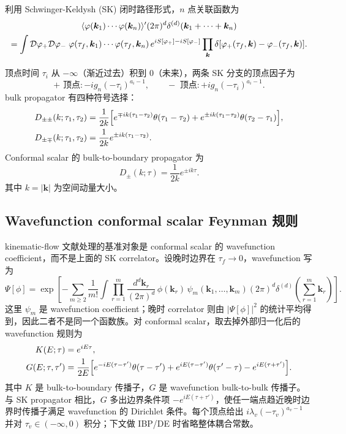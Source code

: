 ﻿\documentclass[a4paper,11pt]{article}
\begin{document}
利用 Schwinger-Keldysh (SK) 闭时路径形式，$n$ 点关联函数为
\begin{gather}
    \langle\varphi(\boldsymbol{k}_1)\cdots\varphi(\boldsymbol{k}_n)\rangle'(2\pi)^d\delta^{(d)}(\boldsymbol{k}_1+\cdots+\boldsymbol{k}_n)\notag\\
    =\int\mathcal{D}\varphi_+\mathcal{D}\varphi_-\;\varphi(\tau_f,\boldsymbol{k}_1)\cdots\varphi(\tau_f,\boldsymbol{k}_n)\,e^{iS[\varphi_+]-iS[\varphi_-]}\prod_{\boldsymbol{k}}\delta[\varphi_+(\tau_f,\boldsymbol{k})-\varphi_-(\tau_f,\boldsymbol{k})].
\end{gather}

顶点时间 $\tau_i$ 从 $-\infty$（渐近过去）积到 $0$（未来），两条 SK 分支的顶点因子为
\begin{equation}
    +\text{ 顶点}: -ig_n(-\tau_i)^{a_i-1},\qquad
    -\text{ 顶点}: +ig_n(-\tau_i)^{a_i-1}.
\end{equation}
bulk propagator 有四种符号选择：
\begin{align}
D_{\pm\pm}(k;\tau_1,\tau_2)
&=\frac{1}{2k}\Bigl[e^{\mp ik(\tau_1-\tau_2)}\theta(\tau_1-\tau_2)+e^{\pm ik(\tau_1-\tau_2)}\theta(\tau_2-\tau_1)\Bigr],\\
D_{\pm\mp}(k;\tau_1,\tau_2)
&=\frac{1}{2k}e^{\pm ik(\tau_1-\tau_2)}.
\end{align}
Conformal scalar 的 bulk-to-boundary propagator 为
\begin{equation}
    D_{\pm}(k;\tau)=\frac{1}{2k}e^{\pm ik\tau}.
\end{equation}
其中 $k=|\boldsymbol{k}|$ 为空间动量大小。

\subsection{Wavefunction conformal scalar Feynman 规则}

kinematic-flow 文献处理的基准对象是 conformal scalar 的 wavefunction coefficient，而不是上面的 SK correlator。设晚时边界在 $\tau_f\to0$，wavefunction 写为
\begin{equation}
    \Psi[\phi]=
    \exp\left[-\sum_{m\ge2}\frac{1}{m!}\int\prod_{r=1}^{m}\frac{d^d\boldsymbol{k}_r}{(2\pi)^d}\,
    \phi(\boldsymbol{k}_r)\,
    \psi_m(\boldsymbol{k}_1,\dots,\boldsymbol{k}_m)
    (2\pi)^d\delta^{(d)}\!\left(\sum_{r=1}^{m}\boldsymbol{k}_r\right)\right].
\end{equation}
这里 $\psi_m$ 是 wavefunction coefficient；晚时 correlator 则由 $|\Psi[\phi]|^2$ 的统计平均得到，因此二者不是同一个函数族。对 conformal scalar，取去掉外部归一化后的 wavefunction 规则为 \cite{Fan:2024frw,Hang:2024frw,Baumann:2024loop}
\begin{align}
    K(E;\tau)&=e^{iE\tau},\\
    G(E;\tau,\tau')&=\frac{1}{2E}\Bigl[
    e^{-iE(\tau-\tau')}\theta(\tau-\tau')
    +e^{iE(\tau-\tau')}\theta(\tau'-\tau)
    -e^{iE(\tau+\tau')}
    \Bigr].
    \label{wfpropagators}
\end{align}
其中 $K$ 是 bulk-to-boundary 传播子，$G$ 是 wavefunction bulk-to-bulk 传播子。与 SK propagator 相比，$G$ 多出边界条件项 $-e^{iE(\tau+\tau')}$，使任一端点趋近晚时边界时传播子满足 wavefunction 的 Dirichlet 条件。每个顶点给出 $i\lambda_v(-\tau_v)^{a_v-1}$ 并对 $\tau_v\in(-\infty,0)$ 积分；下文做 IBP/DE 时省略整体耦合常数。
\end{document}
